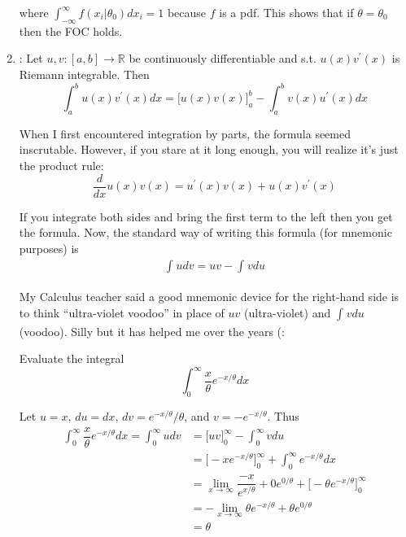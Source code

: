 \documentclass{article}
\begin{document}
\begin{enumerate}
\begin{remark}
    where $\int_{-\infty}^{\infty} f(x_i | \theta_0) dx_i = 1$ because $f$ is a pdf. This  shows that if $\theta= \theta_0$ then the FOC holds.
    \end{remark}

  \item {}: Let $u, v: [a, b] \to \mathbb{R}$ be continuously differentiable and s.t. $u(x) v^\prime(x)$ is Riemann integrable. Then
    \[
      \int_{a}^{b} u(x) v^\prime(x) dx
      =
      \Big[
        u(x) v(x)
      \Big]_{a}^b
      -
      \int_{a}^{b} v(x) u^\prime(x) dx
    \]

    \begin{remark}
      When I first encountered integration by parts, the formula seemed inscrutable. However, if you stare at it long enough, you will realize it's just the product rule:
      \[
        \dfrac{d}{dx} u(x) v(x) = u^\prime(x) v(x) + u(x) v^\prime(x)
      \]

      If you integrate both sides and bring the first term to the left then you get the formula. Now, the standard way of writing this formula (for mnemonic purposes) is
      \begin{align*}
        \int_{}^{} u dv = uv - \int_{}^{} v du
      \end{align*}

      My Calculus teacher said a good mnemonic device for the right-hand side is to think ``ultra-violet voodoo'' in place of $uv$ (ultra-violet) and $\int_{}^{} v du$ (voodoo). Silly but it has helped me over the years (:
    \end{remark}
    \begin{example}
      Evaluate the integral
      \[
        \int_{0}^{\infty} \dfrac{x}{\theta} e^{-x / \theta} dx
      \]

      Let $u = x$, $du = dx$, $dv = e^{-x / \theta} / \theta$, and $v = - e^{-x / \theta}$. Thus
      \begin{align*}
        \int_{0}^{\infty} \dfrac{x}{\theta} e^{-x / \theta} dx
        =
        \int_{0}^{\infty} u dv
        &
        =
        \Big[
          uv
        \Big]_{0}^{\infty}
        -
        \int_{0}^{\infty} v du
        \\
        &
        =
        \Big[
          - x e^{-x / \theta}
        \Big]_{0}^{\infty}
        +
        \int_{0}^{\infty} e^{-x / \theta} dx
        \\
        &
        =
        \lim_{x \to \infty} \dfrac{- x}{e^{x / \theta}}
        + 0 e^{0 / \theta}
        + \Big[
          - \theta
          e^{-x / \theta}
        \Big]_{0}^{\infty}
        \\
        &
        =
        - \lim_{x \to \infty} \theta e^{-x / \theta}
        + \theta e^{0 / \theta}
        \\
        &
        =
        \theta
      \end{align*}
    \end{example}
\end{enumerate}

\clearpage
\printindex

\end{document}
